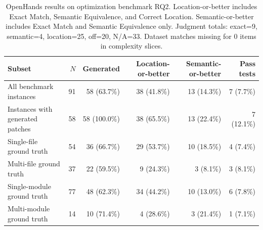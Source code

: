\begin{table}[t]
\centering
\small
\begin{tabular}{lrrrrr}
\toprule
Subset & $N$ & Generated & Location-or-better & Semantic-or-better & Pass tests \\
\midrule
All benchmark instances & 91 & 58 (63.7\%) & 38 (41.8\%) & 13 (14.3\%) & 7 (7.7\%) \\
Instances with generated patches & 58 & 58 (100.0\%) & 38 (65.5\%) & 13 (22.4\%) & 7 (12.1\%) \\
\midrule
Single-file ground truth & 54 & 36 (66.7\%) & 29 (53.7\%) & 10 (18.5\%) & 4 (7.4\%) \\
Multi-file ground truth & 37 & 22 (59.5\%) & 9 (24.3\%) & 3 (8.1\%) & 3 (8.1\%) \\
Single-module ground truth & 77 & 48 (62.3\%) & 34 (44.2\%) & 10 (13.0\%) & 6 (7.8\%) \\
Multi-module ground truth & 14 & 10 (71.4\%) & 4 (28.6\%) & 3 (21.4\%) & 1 (7.1\%) \\
\bottomrule
\end{tabular}
\caption{OpenHands results on optimization benchmark RQ2. Location-or-better includes Exact Match, Semantic Equivalence, and Correct Location. Semantic-or-better includes Exact Match and Semantic Equivalence only. Judgment totals: exact=9, semantic=4, location=25, off=20, N/A=33. Dataset matches missing for 0 items in complexity slices.}
\label{tab:rq2-openhands-results}
\end{table}